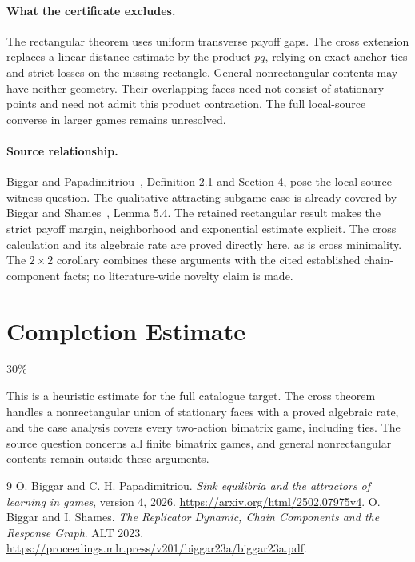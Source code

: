 \documentclass[11pt]{article}
\theoremstyle{definition}
\theoremstyle{remark}
\begin{document}
\paragraph{What the certificate excludes.}
The rectangular theorem uses uniform transverse payoff gaps. The cross
extension replaces a linear distance estimate by the product $pq$, relying
on exact anchor ties and strict losses on the missing rectangle. General
nonrectangular contents may have neither geometry. Their overlapping faces
need not consist of stationary points and need not admit this product
contraction. The full local-source converse in larger games remains
unresolved.

\paragraph{Source relationship.}
Biggar and Papadimitriou~\cite{source}, Definition 2.1 and Section 4, pose the local-source witness question. The qualitative attracting-subgame case is already covered by Biggar and Shames~\cite{chain}, Lemma 5.4. The retained rectangular result makes the strict payoff margin,
neighborhood and exponential estimate explicit. The cross calculation and
its algebraic rate are proved directly here, as is cross minimality.
The $2\times2$ corollary combines these arguments with the cited established
chain-component facts; no literature-wide novelty claim is made.

\section{Completion Estimate}
30\%

This is a heuristic estimate for the full catalogue target.
The cross theorem handles a nonrectangular union of stationary faces with
a proved algebraic rate, and the case analysis covers every two-action
bimatrix game, including ties. The source question concerns all finite
bimatrix games, and general nonrectangular contents remain outside these
arguments.

\begin{thebibliography}{9}
 O. Biggar and C. H. Papadimitriou.
\emph{Sink equilibria and the attractors of learning in games}, version 4, 2026.
\url{https://arxiv.org/html/2502.07975v4}.
 O. Biggar and I. Shames.
\emph{The Replicator Dynamic, Chain Components and the Response Graph}. ALT 2023.
\url{https://proceedings.mlr.press/v201/biggar23a/biggar23a.pdf}.
\end{thebibliography}
\end{document}
